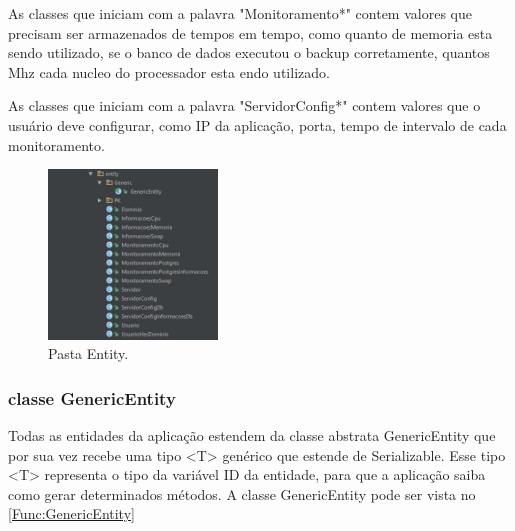 As classes que iniciam com a palavra "Monitoramento*" contem valores que precisam ser armazenados de tempos em tempo, como quanto de memoria esta sendo utilizado, se o banco de dados executou o backup corretamente, quantos Mhz cada nucleo do processador esta endo utilizado.

As classes que iniciam com a palavra "ServidorConfig*" contem valores que o usuário deve configurar, como IP da aplicação, porta, tempo de intervalo de cada monitoramento.


\begin{figure}[H]
	\centering
	\includegraphics[width=0.4\textwidth]{figuras/estruturaPojetoEntity.JPG}
	\caption[Pasta Entity.]{Pasta Entity.}
	\label{Img:estruturaDePastaPojetoEntity}
	
\end{figure}

\subsubsection{classe GenericEntity}\label{subsec:ClassGenericEntity}

Todas as entidades da aplicação estendem da classe abstrata GenericEntity que por sua vez recebe uma tipo <T> genérico que estende de Serializable.
Esse tipo <T> representa o tipo da variável ID da entidade, para que a aplicação saiba como gerar determinados métodos.
A classe GenericEntity pode ser vista no \autoref{Func:GenericEntity}
	
